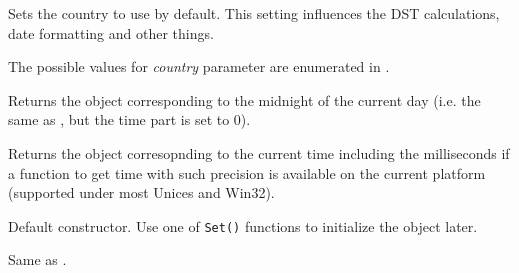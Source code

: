 
Sets the country to use by default. This setting influences the DST
calculations, date formatting and other things.

The possible values for {\it country} parameter are enumerated in
.



\label{wxdatetimetoday}


Returns the object corresponding to the midnight of the current day (i.e. the
same as , but the time part is set to $0$).



\label{wxdatetimeunow}


Returns the object corresopnding to the current time including the
milliseconds if a function to get time with such precision is available on the
current platform (supported under most Unices and Win32).




\label{wxdatetimewxdatetimedef}


Default constructor. Use one of {\tt Set()} functions to initialize the object
later.

\label{wxdatetimewxdatetimetimet}


Same as .


\label{wxdatetimewxdatetimetm}


